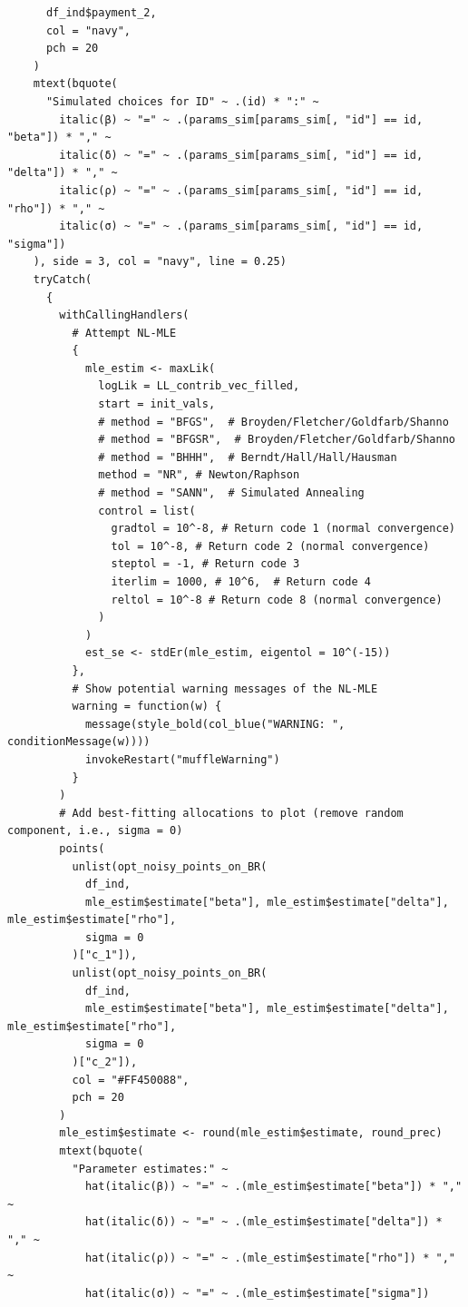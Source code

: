 \documentclass[11pt, a4paper, oneside]{article}
\theoremstyle{Plain}
\theoremstyle{Definition}
\theoremstyle{Remark}
\begin{document}
\begin{appendix}
\begin{lstlisting}
      df_ind$payment_2,
      col = "navy",
      pch = 20
    )
    mtext(bquote(
      "Simulated choices for ID" ~ .(id) * ":" ~
        italic(β) ~ "=" ~ .(params_sim[params_sim[, "id"] == id, "beta"]) * "," ~
        italic(δ) ~ "=" ~ .(params_sim[params_sim[, "id"] == id, "delta"]) * "," ~
        italic(ρ) ~ "=" ~ .(params_sim[params_sim[, "id"] == id, "rho"]) * "," ~
        italic(σ) ~ "=" ~ .(params_sim[params_sim[, "id"] == id, "sigma"])
    ), side = 3, col = "navy", line = 0.25)
    tryCatch(
      {
        withCallingHandlers(
          # Attempt NL-MLE
          {
            mle_estim <- maxLik(
              logLik = LL_contrib_vec_filled,
              start = init_vals,
              # method = "BFGS",  # Broyden/Fletcher/Goldfarb/Shanno
              # method = "BFGSR",  # Broyden/Fletcher/Goldfarb/Shanno
              # method = "BHHH",  # Berndt/Hall/Hall/Hausman
              method = "NR", # Newton/Raphson
              # method = "SANN",  # Simulated Annealing
              control = list(
                gradtol = 10^-8, # Return code 1 (normal convergence)
                tol = 10^-8, # Return code 2 (normal convergence)
                steptol = -1, # Return code 3
                iterlim = 1000, # 10^6,  # Return code 4
                reltol = 10^-8 # Return code 8 (normal convergence)
              )
            )
            est_se <- stdEr(mle_estim, eigentol = 10^(-15))
          },
          # Show potential warning messages of the NL-MLE
          warning = function(w) {
            message(style_bold(col_blue("WARNING: ", conditionMessage(w))))
            invokeRestart("muffleWarning")
          }
        )
        # Add best-fitting allocations to plot (remove random component, i.e., sigma = 0)
        points(
          unlist(opt_noisy_points_on_BR(
            df_ind,
            mle_estim$estimate["beta"], mle_estim$estimate["delta"], mle_estim$estimate["rho"],
            sigma = 0
          )["c_1"]),
          unlist(opt_noisy_points_on_BR(
            df_ind,
            mle_estim$estimate["beta"], mle_estim$estimate["delta"], mle_estim$estimate["rho"],
            sigma = 0
          )["c_2"]),
          col = "#FF450088",
          pch = 20
        )
        mle_estim$estimate <- round(mle_estim$estimate, round_prec)
        mtext(bquote(
          "Parameter estimates:" ~
            hat(italic(β)) ~ "=" ~ .(mle_estim$estimate["beta"]) * "," ~
            hat(italic(δ)) ~ "=" ~ .(mle_estim$estimate["delta"]) * "," ~
            hat(italic(ρ)) ~ "=" ~ .(mle_estim$estimate["rho"]) * "," ~
            hat(italic(σ)) ~ "=" ~ .(mle_estim$estimate["sigma"])

\end{lstlisting}
\end{appendix}
\end{document}
